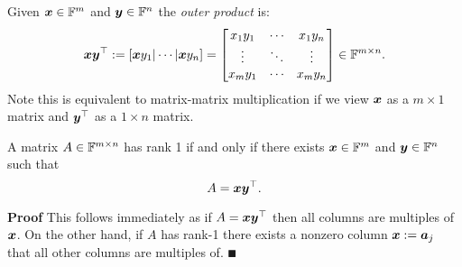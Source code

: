 \begin{definition} Given $\bm{{\mbox{\boldmath$x$\unboldmath}}} \in {\mathbb F}^m$ and $\bm{{\mbox{\boldmath$y$\unboldmath}}} \in {\mathbb F}^n$ the \emph{outer product} is:
\[
\ensuremath{\bm{\x}} \ensuremath{\bm{\y}}^\ensuremath{\top} := [\ensuremath{\bm{\x}} y_1 | \ensuremath{\cdots} | \ensuremath{\bm{\x}} y_n] = \begin{bmatrix} x_1 y_1 & \ensuremath{\cdots} & x_1 y_n \\
                        \ensuremath{\vdots} & \ensuremath{\ddots} & \ensuremath{\vdots} \\
                        x_m y_1 & \ensuremath{\cdots} & x_m y_n \end{bmatrix} \ensuremath{\in} \ensuremath{\bbF}^{m \ensuremath{\times} n}.
\]
Note this is equivalent to matrix-matrix multiplication if we view $\bm{{\mbox{\boldmath$x$\unboldmath}}}$ as a $m \ensuremath{\times} 1$ matrix and $\bm{{\mbox{\boldmath$y$\unboldmath}}}^\top$ as a $1 \ensuremath{\times} n$ matrix. \end{definition}

\begin{proposition}[rank-1] A matrix $A \in {\mathbb F}^{m\times n}$ has rank 1 if and only if there exists $\bm{{\mbox{\boldmath$x$\unboldmath}}} \in {\mathbb F}^m$ and $\bm{{\mbox{\boldmath$y$\unboldmath}}} \in {\mathbb F}^n$ such that
\[
A = \bm{{\mbox{\boldmath$x$\unboldmath}}} \bm{{\mbox{\boldmath$y$\unboldmath}}}^\top.
\]
\end{proposition}
\textbf{Proof} This follows immediately as if $A = \bm{{\mbox{\boldmath$x$\unboldmath}}} \bm{{\mbox{\boldmath$y$\unboldmath}}}^\top$ then all columns are multiples of $\bm{{\mbox{\boldmath$x$\unboldmath}}}$. On the other hand, if $A$ has rank-1 there exists a nonzero column $\bm{{\mbox{\boldmath$x$\unboldmath}}} := \bm{{\mbox{\boldmath$a$\unboldmath}}}_j$ that all other columns are multiples of. \ensuremath{\QED}

